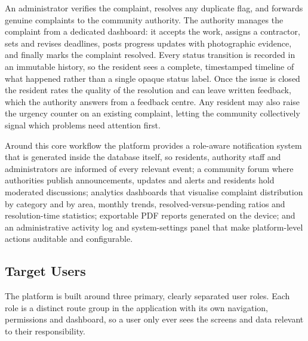 \documentclass[11pt,a4paper]{article}
\begin{document}
An administrator verifies the complaint, resolves any duplicate flag, and
forwards genuine complaints to the community authority. The authority manages the
complaint from a dedicated dashboard: it accepts the work, assigns a contractor,
sets and revises deadlines, posts progress updates with photographic evidence,
and finally marks the complaint resolved. Every status transition is recorded in
an immutable history, so the resident sees a complete, timestamped timeline of
what happened rather than a single opaque status label. Once the issue is closed
the resident rates the quality of the resolution and can leave written feedback,
which the authority answers from a feedback centre. Any resident may also raise
the urgency counter on an existing complaint, letting the community collectively
signal which problems need attention first.

Around this core workflow the platform provides a role-aware notification system
that is generated inside the database itself, so residents, authority staff and
administrators are informed of every relevant event; a community forum where
authorities publish announcements, updates and alerts and residents hold
moderated discussions; analytics dashboards that visualise complaint distribution
by category and by area, monthly trends, resolved-versus-pending ratios and
resolution-time statistics; exportable PDF reports generated on the device; and
an administrative activity log and system-settings panel that make platform-level
actions auditable and configurable.

\subsection{Target Users}

The platform is built around three primary, clearly separated user roles. Each
role is a distinct route group in the application with its own navigation,
permissions and dashboard, so a user only ever sees the screens and data relevant
to their responsibility.
\end{document}
